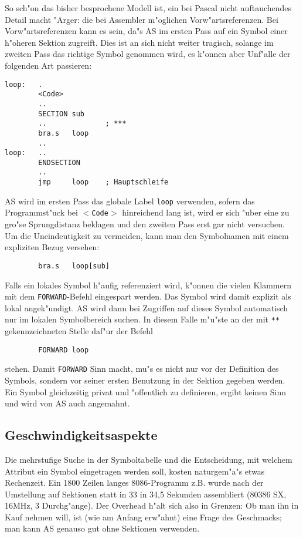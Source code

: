 \documentclass[12pt,a4paper,twoside]{report}
\newcommand{\tty}[1]{{\tt #1}}
\begin{document}
So sch"on das bisher besprochene Modell ist, ein bei Pascal nicht
auftauchendes Detail macht "Arger: die bei Assembler m"oglichen
Vorw"artsreferenzen.  Bei Vorw"artsreferenzen kann es sein, da"s AS
im ersten Pass auf ein Symbol einer h"oheren Sektion zugreift.  Dies
ist an sich nicht weiter tragisch, solange im zweiten Pass das richtige
Symbol genommen wird, es k"onnen aber Unf"alle der folgenden Art passieren:
\begin{verbatim}
loop:   .
        <Code>
        ..
        SECTION sub
        ..              ; ***
        bra.s   loop
        ..
loop:   ..
        ENDSECTION
        ..
        jmp     loop    ; Hauptschleife
\end{verbatim}
AS wird im ersten Pass das globale Label \tty{loop} verwenden, sofern
das Programmst"uck bei \tty{$<$Code$>$} hinreichend lang ist, wird er
sich "uber eine zu gro"se Sprungdistanz beklagen und den zweiten Pass erst
gar nicht versuchen.  Um die Uneindeutigkeit zu vermeiden, kann man den
Symbolnamen mit einem expliziten Bezug versehen:
\begin{verbatim}
        bra.s   loop[sub]
\end{verbatim}
Falls ein lokales Symbol h"aufig referenziert wird, k"onnen die vielen
Klammern mit dem \tty{FORWARD}-Befehl eingespart werden.  Das Symbol
wird damit explizit als lokal angek"undigt.  AS wird dann bei Zugriffen
auf dieses Symbol automatisch nur im lokalen Symbolbereich suchen.
In diesem Falle m"u"ste an der mit \tty{***} gekennzeichneten Stelle
daf"ur der Befehl
\begin{verbatim}
        FORWARD loop
\end{verbatim}
stehen.
Damit \tty{FORWARD} Sinn macht, mu"s es nicht nur vor der Definition des
Symbols, sondern vor seiner ersten Benutzung in der Sektion gegeben werden.
Ein Symbol gleichzeitig privat und "offentlich zu definieren, ergibt keinen
Sinn und wird von AS auch angemahnt.


\subsection{Geschwindigkeitsaspekte}

Die mehrstufige Suche in der Symboltabelle und die Entscheidung, mit welchem
Attribut ein Symbol eingetragen werden soll, kosten naturgem"a"s etwas
Rechenzeit.  Ein 1800 Zeilen langes 8086-Programm z.B. wurde nach der
Umstellung auf Sektionen statt in 33 in 34,5 Sekunden assembliert
(80386 SX, 16MHz, 3 Durchg"ange).  Der Overhead h"alt sich also in Grenzen:
Ob man ihn in Kauf nehmen will, ist (wie am Anfang erw"ahnt) eine Frage des
Geschmacks;  man kann AS genauso gut ohne Sektionen verwenden.
\end{document}
